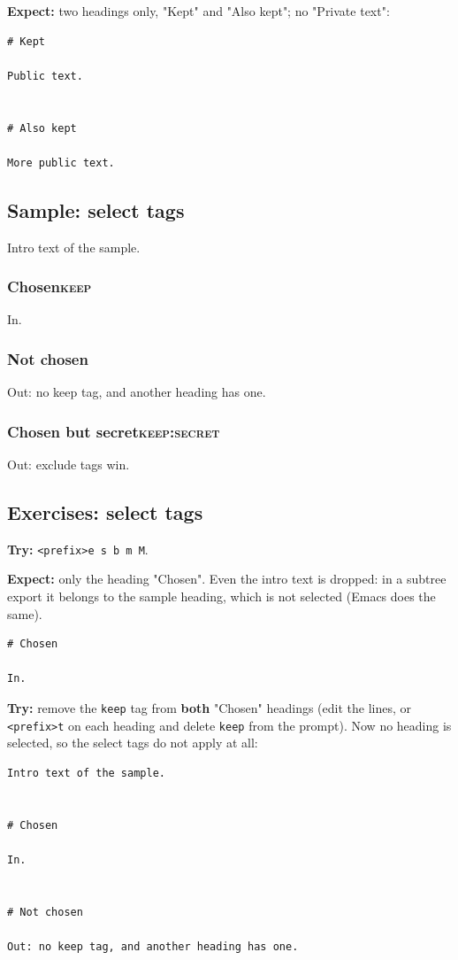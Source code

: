 \textbf{Expect:} two headings only, "Kept" and "Also kept"; no "Private text":

\begin{verbatim}
# Kept

Public text.


# Also kept

More public text.
\end{verbatim}
\subsection{Sample: select tags}
\label{sec:org760f570}
Intro text of the sample.
\subsubsection{Chosen\hfill{}\textsc{keep}}
\label{sec:orgb9b8308}
In.
\subsubsection{Not chosen}
\label{sec:org6edcd02}
Out: no keep tag, and another heading has one.
\subsubsection{Chosen but secret\hfill{}\textsc{keep:secret}}
\label{sec:orgd462ce2}
Out: exclude tags win.
\subsection{Exercises: select tags}
\label{sec:orgc851d76}
\textbf{Try:} \texttt{<prefix>e s b m M}.

\textbf{Expect:} only the heading "Chosen". Even the intro text is dropped: in a
subtree export it belongs to the sample heading, which is not selected
(Emacs does the same).

\begin{verbatim}
# Chosen

In.
\end{verbatim}

\textbf{Try:} remove the \texttt{keep} tag from \textbf{both} "Chosen" headings (edit the
lines, or \texttt{<prefix>t} on each heading and delete \texttt{keep} from the prompt).
Now no heading is selected, so the select tags do not apply at all:

\begin{verbatim}
Intro text of the sample.


# Chosen

In.


# Not chosen

Out: no keep tag, and another heading has one.
\end{verbatim}

